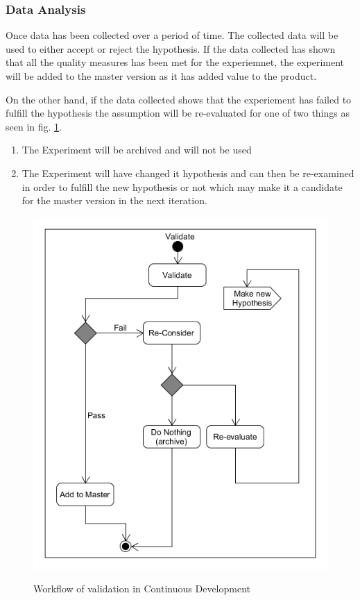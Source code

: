 \documentclass{sig-alternate}
\begin{document}
\subsubsection{Data Analysis}
\label{cx:analyse}
Once data has been collected over a period of time. The collected data will be used to either accept or reject
the hypothesis. 
If the data collected has shown that all the quality measures has been met for the experiemnet, 
the experiment will be added to the master version as it has added value to the product.

On the other hand, if the data collected shows that the experiement has failed to fulfill the hypothesis 
the assumption will be re-evaluated for one of two things as seen in fig. \ref{fig:validation}. 
\begin{enumerate}
\item The Experiment will be archived and will not be used
\item The Experiment will have changed it hypothesis and can then be re-examined in order to fulfill the new 
hypothesis or not which may make it a candidate for the master version in the next iteration.
\end{enumerate}

\begin{figure}
\centering
\caption{Workflow of validation in Continuous Development}
\includegraphics[scale=0.4]{Umlet/ValidateActivity}
\label{fig:validation}
\end{figure}
\end{document}
